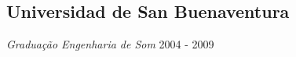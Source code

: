 \documentclass[a4paper,10pt]{article}
\begin{document}
\subsection*{Universidad de San Buenaventura}
\textcolor{corSubSection}{\emph{Graduação Engenharia de Som}}
\hfill \textcolor{corSubSection}{2004 - 2009}








\end{document}
